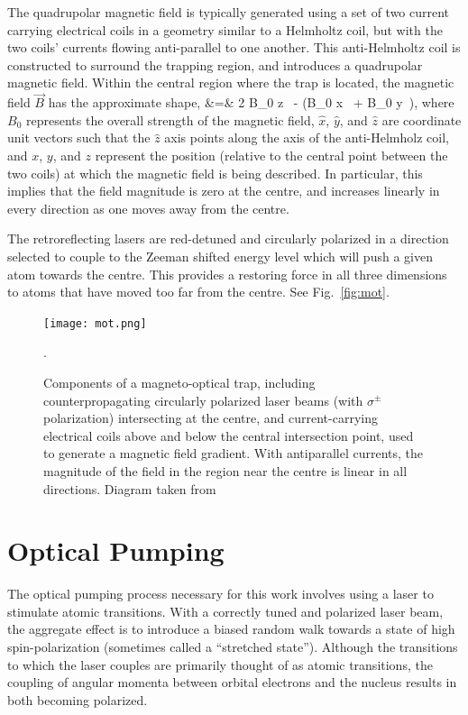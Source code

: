 The quadrupolar magnetic field is typically generated using a set of two current carrying electrical coils in a geometry similar to a Helmholtz coil, but with the two coils' currents flowing anti-parallel to one another.  This anti-Helmholtz coil is constructed to surround the trapping region, and introduces a quadrupolar magnetic field.  Within the central region where the trap is located, the magnetic field $\vec{B}$ has the approximate shape,
\bea
	 &=& 2 B_0 z \, - (B_0 x \, + B_0 y \,), 
\eea
where $B_0$ represents the overall strength of the magnetic field, $\hat{x}$, $\hat{y}$, and $\hat{z}$ are coordinate unit vectors such that the $\hat{z}$ axis points along the axis of the anti-Helmholz coil, and $x$, $y$, and $z$ represent the position (relative to the central point between the two coils) at which the magnetic field is being described.
In particular, this implies that the field magnitude is zero at the centre, and increases linearly in every direction as one moves away from the centre.

The retroreflecting lasers are red-detuned and circularly polarized in a direction selected to couple to the Zeeman shifted energy level which will push a given atom towards the centre.  This provides a restoring force in all three dimensions to atoms that have moved too far from the centre.  See Fig.~\ref{fig:mot}.

\begin{figure}[h!!!!!t!b]
	\centering
		\texttt{[image: mot.png]}
		\caption[Components of a Magneto-Optical Trap]{Components of a magneto-optical trap, including counterpropagating circularly polarized laser beams (with $\sigma^\pm$ polarization) intersecting at the centre, and current-carrying electrical coils above and below the central intersection point, used to generate a magnetic field gradient.  With antiparallel currents, the magnitude of the field in the region near the centre is linear in all directions.  Diagram taken from~\cite{thesis}}.
		\label{fig:mot}
    	\label{fig:themot}
\end{figure}



\section{Optical Pumping}
\label{sec:op}
The optical pumping process necessary for this work involves using a laser to stimulate atomic transitions.  With a correctly tuned and polarized laser beam, the aggregate effect is to introduce a biased random walk towards a state of high spin-polarization (sometimes called a ``stretched state'').  Although the transitions to which the laser couples are primarily thought of as atomic transitions, the coupling of angular momenta between orbital electrons and the nucleus results in both becoming polarized.  

